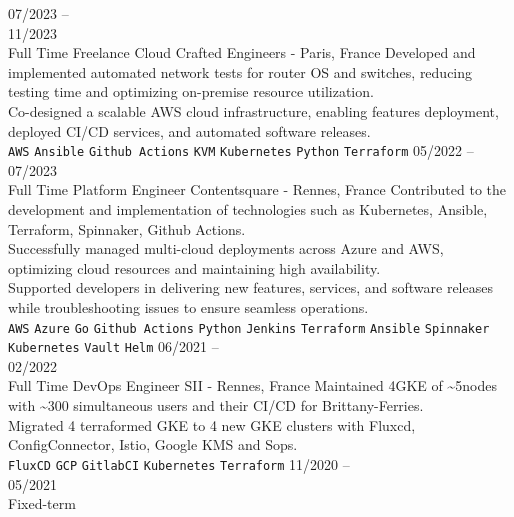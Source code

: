 \documentclass[10pt]{developercv} %
\begin{document}
\begin{entrylist}
	\entry
		{07/2023 --\\11/2023\\\footnotesize{Full Time}}
		{Freelance}
		{Cloud Crafted Engineers - Paris, France}
		{Developed and implemented automated network tests for router OS and switches, reducing testing time and optimizing on-premise resource utilization.\\
		Co-designed a scalable AWS cloud infrastructure, enabling features deployment, deployed CI/CD services, and automated software releases.\\
		\texttt{AWS}\slashsep
		\texttt{Ansible}\slashsep
		\texttt{Github Actions}\slashsep
		\texttt{KVM}\slashsep
		\texttt{Kubernetes}\slashsep
		\texttt{Python}\slashsep
		\texttt{Terraform}}
	\entry
		{05/2022 --\\07/2023\\\footnotesize{Full Time}}
		{Platform Engineer}
		{Contentsquare - Rennes, France}
		{Contributed to the development and implementation of technologies such as Kubernetes, Ansible, Terraform, Spinnaker, Github Actions.\\
		Successfully managed multi-cloud deployments across Azure and AWS, optimizing cloud resources and maintaining high availability.\\
		Supported developers in delivering new features, services, and software releases while troubleshooting issues to ensure seamless operations.\\
		\texttt{AWS}\slashsep
		\texttt{Azure}\slashsep
		\texttt{Go}\slashsep
		\texttt{Github Actions}\slashsep
		\texttt{Python}\slashsep
		\texttt{Jenkins}\slashsep
		\texttt{Terraform}\slashsep
		\texttt{Ansible}\slashsep
		\texttt{Spinnaker}\slashsep
		\texttt{Kubernetes}\slashsep
		\texttt{Vault}\slashsep
		\texttt{Helm}
		}
	\entry
		{06/2021 --\\02/2022\\\footnotesize{Full Time}}
		{DevOps Engineer}
		{SII - Rennes, France}
		{Maintained 4GKE of \textasciitilde5nodes with \textasciitilde300 simultaneous users and their CI/CD for Brittany-Ferries.\\
Migrated 4 terraformed GKE to 4 new GKE clusters with Fluxcd, ConfigConnector, Istio, Google KMS and Sops.\\
		\texttt{FluxCD}\slashsep
		\texttt{GCP}\slashsep
		\texttt{GitlabCI}\slashsep
		\texttt{Kubernetes}\slashsep
		\texttt{Terraform}
		}
	\entry
		{11/2020 --\\05/2021\\\footnotesize{Fixed-term}}

\end{entrylist}
\end{document}
